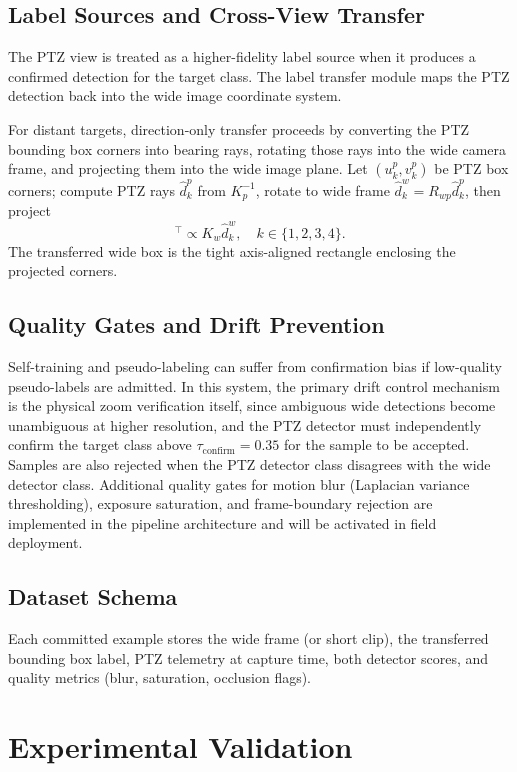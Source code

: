 \documentclass[conf]{new-aiaa}
\begin{document}
\subsection{Label Sources and Cross-View Transfer}
The PTZ view is treated as a higher-fidelity label source when it produces a confirmed detection for the target class. The label transfer module maps the PTZ detection back into the wide image coordinate system.
\par
For distant targets, direction-only transfer proceeds by converting the PTZ bounding box corners into bearing rays, rotating those rays into the wide camera frame, and projecting them into the wide image plane. Let $(u^p_k,v^p_k)$ be PTZ box corners; compute PTZ rays $\hat{d}^p_k$ from $K_p^{-1}$, rotate to wide frame $\hat{d}^w_k = R_{wp}\hat{d}^p_k$, then project
\begin{equation}
[u^w_k, v^w_k, 1]^\top \propto K_w \hat{d}^w_k, \quad k \in \{1,2,3,4\}.
\end{equation}
The transferred wide box is the tight axis-aligned rectangle enclosing the projected corners.

\subsection{Quality Gates and Drift Prevention}
Self-training and pseudo-labeling can suffer from confirmation bias if low-quality pseudo-labels are admitted. In this system, the primary drift control mechanism is the physical zoom verification itself, since ambiguous wide detections become unambiguous at higher resolution, and the PTZ detector must independently confirm the target class above $\tau_{\mathrm{confirm}} = 0.35$ for the sample to be accepted. Samples are also rejected when the PTZ detector class disagrees with the wide detector class. Additional quality gates for motion blur (Laplacian variance thresholding), exposure saturation, and frame-boundary rejection are implemented in the pipeline architecture and will be activated in field deployment.

\subsection{Dataset Schema}
Each committed example stores the wide frame (or short clip), the transferred bounding box label, PTZ telemetry at capture time, both detector scores, and quality metrics (blur, saturation, occlusion flags).

\section{Experimental Validation}
\end{document}
